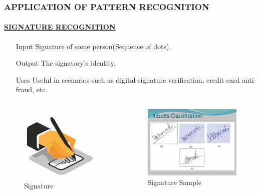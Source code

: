 \documentclass{beamer}
\begin{document}
\begin{frame}

\frametitle{APPLICATION OF PATTERN RECOGNITION}\pause
\framesubtitle{\underline{SIGNATURE RECOGNITION}}\pause
 \begin{itemize}
 \item[Input] Signature of some person(Sequence of dots).\pause
 \item[Output] The signatory's identity.\pause
\item[Uses] Useful in scenarios such as digital signature verification, credit card anti-fraud, etc.\pause
 \end{itemize}
 \begin{columns}
 \begin{column}{.6\textwidth}
\begin{figure}
\includegraphics[width=.6\textwidth]{sig.jpg}
\caption{Signature}\pause
\end{figure} 
 \end{column}
 \begin{column}{.6\textwidth}
\begin{figure}
\includegraphics[width=.6\textwidth]{sigg.jpg}
\caption{Signature Sample}\pause
\end{figure} 
 \end{column}
\end{columns}
\end{frame}
\end{document}
